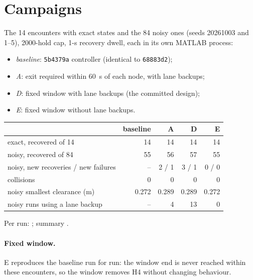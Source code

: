 \documentclass[11pt]{article}
\begin{document}
\section{Campaigns}
The 14 encounters with exact states and the 84 noisy ones (seeds 20261003 and
1--5), 2000-hold cap, 1-s recovery dwell, each in its own MATLAB process:
\begin{itemize}
\item \emph{baseline}: \texttt{5b4379a} controller (identical to
  \texttt{68883d2});
\item \emph{A}: exit required within 60~s of each node, with lane backups;
\item \emph{D}: fixed window with lane backups (the committed design);
\item \emph{E}: fixed window without lane backups.
\end{itemize}
\begin{center}
\begin{tabular}{lrrrr}
\toprule
 & baseline & A & D & E\\
\midrule
exact, recovered of 14 & 14 & 14 & 14 & 14\\
noisy, recovered of 84 & 55 & 56 & 57 & 55\\
noisy, new recoveries / new failures & -- & 2 / 1 & 3 / 1 & 0 / 0\\
collisions & 0 & 0 & 0 & 0\\
noisy smallest clearance (m) & 0.272 & 0.289 & 0.289 & 0.272\\
noisy runs using a lane backup & -- & 4 & 13 & 0\\
\bottomrule
\end{tabular}
\end{center}
Per run: ; summary
.

\paragraph{Fixed window.} E reproduces the baseline run for run: the window
end is never reached within these encounters, so the window removes H4
without changing behaviour.
\end{document}
